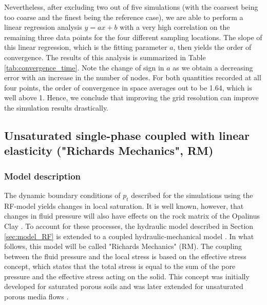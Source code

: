 Nevertheless, after excluding two out of five simulations (with the coarsest being too coarse and the finest being the reference case), we are able to perform a linear regression analysis $y = ax + b$ with a very high correlation on the remaining three data points for the four different sampling locations. The slope of this linear regression, which is the fitting parameter $a$, then yields the order of convergence. The results of this analysis is summarized in Table \ref{tab:convergence_time}. Note the change of sign in $a$ as we obtain a decreasing error with an increase in the number of nodes. For both quantities recorded at all four points, the order of convergence in space averages out to be 1.64, which is well above 1. Hence, we conclude that improving the grid resolution can improve the simulation results drastically.

\subsection{Unsaturated single-phase coupled with linear elasticity ("Richards Mechanics", RM)}\label{sec:RM}
\subsubsection{Model description}\label{sec:model_RM}
The dynamic boundary conditions of $p_t$ described for the simulations using the RF-model yields changes in local saturation. It is well known, however, that changes in fluid pressure will also have effects on the rock matrix of the Opalinus Clay \cite{wild2017}. To account for these processes, the hydraulic model described in Section \ref{sec:model_RF} is extended to a coupled hydraulic-mechanical model \cite{lewis1998}. In what follows, this model will be called "Richards Mechanics" (RM). The coupling between the fluid pressure and the local stress is based on the effective stress concept, which states that the total stress is equal to the sum of the pore pressure and the effective stress acting on the solid. This concept was initially developed for saturated porous soils\cite{biot1941,terzaghi1943} and was later extended for unsaturated porous media flows \cite{bishop1963}. 

